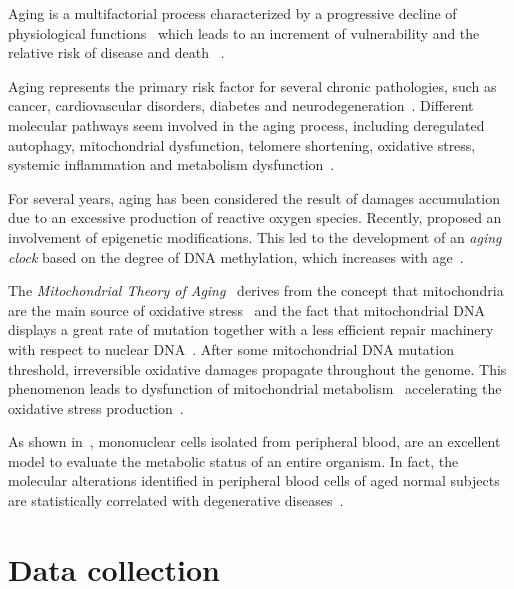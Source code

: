 Aging is a multifactorial process characterized by a progressive decline of physiological functions~\cite{campisi2013aging} which leads to an increment of vulnerability and the relative risk of disease and death ~\cite{bratic2010mitochondrial}.

Aging represents the primary risk factor for several chronic pathologies, such as cancer, cardiovascular disorders, diabetes and neurodegeneration~\cite{lopez2013hallmarks}. Different molecular pathways seem involved in the aging process, including deregulated autophagy, mitochondrial dysfunction, telomere shortening, oxidative stress, systemic inflammation and metabolism dysfunction~\cite{lopez2013hallmarks, riera2016signaling}.

For several years, aging has been considered the result of damages accumulation due to an excessive production of reactive oxygen species.
Recently,  \cite{thompson2017epigenetic} proposed an involvement of epigenetic modifications. This led to the development of an \textit{aging clock} based on the degree of DNA methylation, which increases with age~\cite{horvath2013dna}. 

The \textit{Mitochondrial Theory of Aging}~\cite{harman1972biologic, sastre2000mitochondrial} derives from the  concept that mitochondria are the main source of oxidative stress~\cite{cadenas2000mitochondrial, turrens2003mitochondrial, dai2014mitochondrial} and the fact that mitochondrial DNA displays a
great rate of mutation together with a less efficient repair machinery with respect to nuclear DNA~\cite{short2005decline}. After some mitochondrial DNA mutation threshold, irreversible oxidative damages propagate throughout the genome. This phenomenon leads to dysfunction of mitochondrial metabolism~\cite{genova2004mitochondrial} accelerating the oxidative stress production~\cite{wallace2010mitochondrial}.

As shown in~\cite{mckerrell2015leukemia}, mononuclear cells isolated from peripheral blood, are an excellent model to evaluate the metabolic status of an entire organism. In fact, the molecular alterations identified in peripheral blood cells of aged normal subjects are statistically correlated with degenerative diseases~\cite{jaiswal2014age}.


\section{Data collection} \label{sec:frassoni_data_collection}

